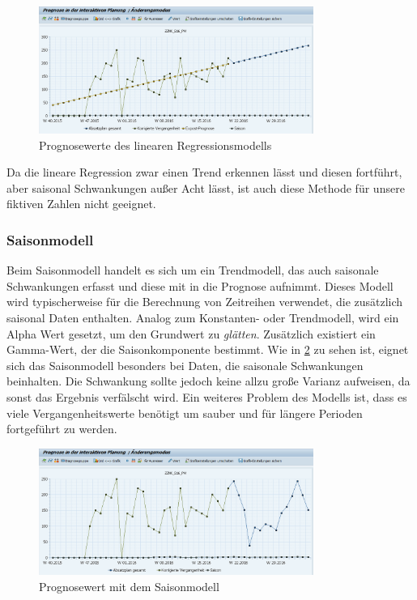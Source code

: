 \begin{figure}[h]
	\centering
	\includegraphics[width=0.8\textwidth]{../pics/Lineare_Regressionmodell_nko}
	\caption{Prognosewerte des linearen Regressionsmodells}
	\label{fig:lin_reg}
\end{figure}
Da die lineare Regression zwar einen Trend erkennen lässt und diesen fortführt, aber saisonal Schwankungen außer Acht lässt, ist auch diese Methode für unsere fiktiven Zahlen nicht geeignet.

\subsubsection{Saisonmodell}
Beim Saisonmodell handelt es sich um ein Trendmodell, das auch saisonale Schwankungen erfasst und diese mit in die Prognose aufnimmt. Dieses Modell wird typischerweise für die Berechnung von Zeitreihen verwendet, die zusätzlich saisonal Daten enthalten. Analog zum Konstanten- oder Trendmodell, wird ein Alpha Wert gesetzt, um den Grundwert zu \textit{glätten}. Zusätzlich existiert ein Gamma-Wert, der die Saisonkomponente bestimmt. 
Wie in \ref{fig:saison} zu sehen ist, eignet sich das Saisonmodell besonders bei Daten, die saisonale Schwankungen beinhalten. Die Schwankung sollte jedoch keine allzu große Varianz aufweisen, da sonst das Ergebnis verfälscht wird. Ein weiteres Problem des Modells ist, dass es viele Vergangenheitswerte benötigt um sauber und für längere Perioden fortgeführt zu werden.
\begin{figure}[h]
	\centering
	\includegraphics[width=0.8\textwidth]{../pics/Saisonmodell_nko}
	\caption{Prognosewert mit dem Saisonmodell}
	\label{fig:saison}
\end{figure}

